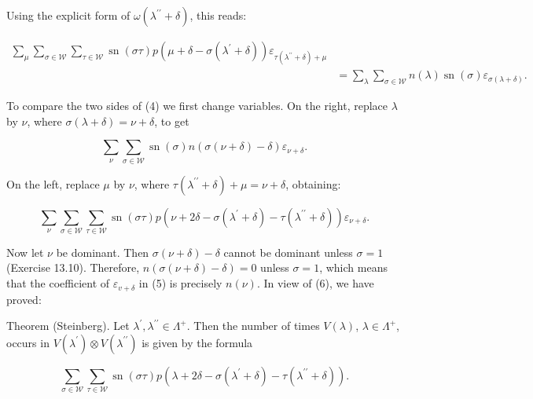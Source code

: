 \documentclass[10pt]{article}
\begin{document}
Using the explicit form of $\omega\left(\lambda^{\prime \prime}+\delta\right)$, this reads:


\begin{align*}
\sum_{\mu} \sum_{\sigma \in \mathscr{W}} \sum_{\tau \in \mathscr{W}} \operatorname{sn}(\sigma \tau) p\left(\mu+\delta-\sigma\left(\lambda^{\prime}+\delta\right)\right) \varepsilon_{\tau\left(\lambda^{\prime \prime}+\delta\right)+\mu} &  \tag{4}\\
& =\sum_{\lambda} \sum_{\sigma \in \mathscr{W}} n(\lambda) \operatorname{sn}(\sigma) \varepsilon_{\sigma(\lambda+\delta)} .
\end{align*}


To compare the two sides of (4) we first change variables. On the right, replace $\lambda$ by $\nu$, where $\sigma(\lambda+\delta)=\nu+\delta$, to get


\begin{equation*}
\sum_{\nu} \sum_{\sigma \in \mathscr{W}} \operatorname{sn}(\sigma) n(\sigma(\nu+\delta)-\delta) \varepsilon_{\nu+\delta} . \tag{5}
\end{equation*}


On the left, replace $\mu$ by $\nu$, where $\tau\left(\lambda^{\prime \prime}+\delta\right)+\mu=\nu+\delta$, obtaining:


\begin{equation*}
\sum_{\nu} \sum_{\sigma \in \mathscr{W}} \sum_{\tau \in \mathscr{W}} \operatorname{sn}(\sigma \tau) p\left(\nu+2 \delta-\sigma\left(\lambda^{\prime}+\delta\right)-\tau\left(\lambda^{\prime \prime}+\delta\right)\right) \varepsilon_{\nu+\delta} . \tag{6}
\end{equation*}


Now let $\nu$ be dominant. Then $\sigma(\nu+\delta)-\delta$ cannot be dominant unless $\sigma=1$ (Exercise 13.10). Therefore, $n(\sigma(\nu+\delta)-\delta)=0$ unless $\sigma=1$, which means that the coefficient of $\varepsilon_{v+\delta}$ in (5) is precisely $n(\nu)$. In view of (6), we have proved:

Theorem (Steinberg). Let $\lambda^{\prime}, \lambda^{\prime \prime} \in \Lambda^{+}$. Then the number of times $V(\lambda)$, $\lambda \in \Lambda^{+}$, occurs in $V\left(\lambda^{\prime}\right) \otimes V\left(\lambda^{\prime \prime}\right)$ is given by the formula

$$
\sum_{\sigma \in \mathscr{W}} \sum_{\tau \in \mathscr{W}} \operatorname{sn}(\sigma \tau) p\left(\lambda+2 \delta-\sigma\left(\lambda^{\prime}+\delta\right)-\tau\left(\lambda^{\prime \prime}+\delta\right)\right) .
$$
\end{document}
